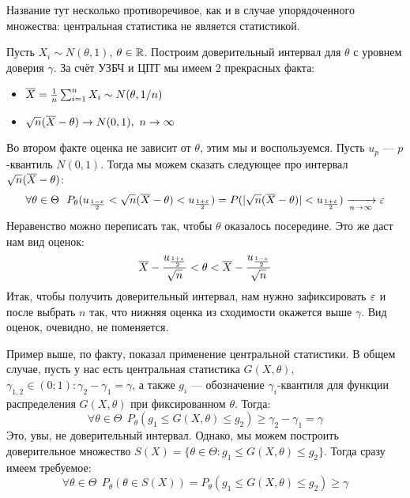 \begin{note}
	Название тут несколько противоречивое, как и в случае упорядоченного множества: центральная статистика не является статистикой.
\end{note}

\begin{example}
	Пусть $X_i \sim N(\theta, 1)$, $\theta \in \mathbb{R}$. Построим доверительный интервал для $\theta$ с уровнем доверия $\gamma$. За счёт УЗБЧ и ЦПТ мы имеем 2 прекрасных факта:
	\begin{itemize}
		\item $\overline{X} = \frac{1}{n}\sum_{i = 1}^n X_i \sim N(\theta, 1 / n)$
		
		\item $\sqrt{n}(\overline{X} - \theta) \to N(0, 1),\ n \to \infty$
	\end{itemize}
	Во втором факте оценка не зависит от $\theta$, этим мы и воспользуемся. Пусть $u_p$ --- $p$-квантиль $N(0, 1)$. Тогда мы можем сказать следующее про интервал $\sqrt{n}(\overline{X} - \theta)$:
	\[
		\forall \theta \in \Theta\ \ P_\theta(u_{\frac{1 - \varepsilon}{2}} < \sqrt{n}(\overline{X} - \theta) < u_{\frac{1 + \varepsilon}{2}}) = P(|\sqrt{n}(\overline{X} - \theta)| < u_{\frac{1 + \varepsilon}{2}}) \xrightarrow[n \to \infty]{} \varepsilon
	\]
	Неравенство можно переписать так, чтобы $\theta$ оказалось посередине. Это же даст нам вид оценок:
	\[
		 \overline{X} - \frac{u_{\frac{1 + \varepsilon}{2}}}{\sqrt{n}} < \theta < \overline{X} - \frac{u_{\frac{1 - \varepsilon}{2}}}{\sqrt{n}}
	\]
	Итак, чтобы получить доверительный интервал, нам нужно зафиксировать $\varepsilon$ и после выбрать $n$ так, что нижняя оценка из сходимости окажется выше $\gamma$. Вид оценок, очевидно, не поменяется.
\end{example}

\begin{note}
	Пример выше, по факту, показал применение центральной статистики. В общем случае, пусть у нас есть центральная статистика $G(X, \theta)$, $\gamma_{1, 2} \in (0; 1) \colon \gamma_2 - \gamma_1 = \gamma$, а также $g_i$ --- обозначение $\gamma_i$-квантиля для функции распределения $G(X, \theta)$ при фиксированном $\theta$. Тогда:
	\[
		\forall \theta \in \Theta\ \ P_\theta(g_1 \le G(X, \theta) \le g_2) \ge \gamma_2 - \gamma_1 = \gamma
	\]
	Это, увы, не доверительный интервал. Однако, мы можем построить доверительное множество $S(X) = \{\theta \in \Theta \colon g_1 \le G(X, \theta) \le g_2\}$. Тогда сразу имеем требуемое:
	\[
		\forall \theta \in \Theta\ \ P_\theta(\theta \in S(X)) = P_\theta(g_1 \le G(X, \theta) \le g_2) \ge \gamma
	\]
\end{note}

